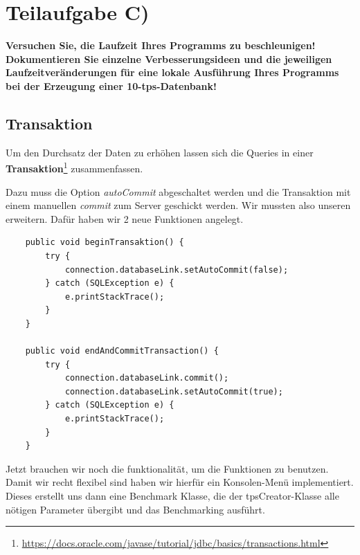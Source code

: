 \section{Teilaufgabe C)}
\textbf{Versuchen Sie, die Laufzeit Ihres Programms zu beschleunigen! Dokumentieren Sie
einzelne Verbesserungsideen und die jeweiligen Laufzeitveränderungen für eine lokale
Ausführung Ihres Programms bei der Erzeugung einer 10-tps-Datenbank!}

\subsection{Transaktion}
Um den Durchsatz der Daten zu erhöhen lassen sich die Queries in einer
\textbf{Transaktion}\footnote{\url{https://docs.oracle.com/javase/tutorial/jdbc/basics/transactions.html}} zusammenfassen.  

Dazu muss die Option \textit{autoCommit} abgeschaltet werden und die Transaktion
mit einem manuellen \textit{commit} zum Server geschickt werden. Wir mussten
also unseren  erweitern. Dafür haben wir 2 neue
Funktionen angelegt.

\begin{lstlisting}
	public void beginTransaktion() {
		try {
			connection.databaseLink.setAutoCommit(false);
		} catch (SQLException e) {
			e.printStackTrace();
		}
	}
	
	public void endAndCommitTransaction() {
		try {
			connection.databaseLink.commit();
			connection.databaseLink.setAutoCommit(true);
		} catch (SQLException e) {
			e.printStackTrace();
		}
	}
\end{lstlisting}


Jetzt brauchen wir noch die funktionalität, um die Funktionen zu benutzen. Damit
wir recht flexibel sind haben wir hierfür ein Konsolen-Menü implementiert.
Dieses erstellt uns dann eine Benchmark Klasse, die der tpsCreator-Klasse alle
nötigen Parameter übergibt und das Benchmarking ausführt.\\

